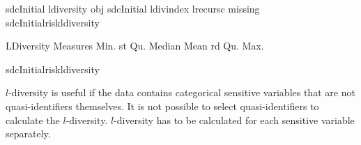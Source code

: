 \documentclass[letterpaper,10pt,english]{sphinxmanual}
\begin{document}
%
\begin{sphinxVerbatim}[commandchars=\\\{\}]

sdcInitial  ldiversity\PYGZbs{} obj  sdcInitial ldiv\PYGZus{}index   l\PYGZus{}recurs\PYGZus{}c   missing  
sdcInitialriskldiversity

LDiversity Measures
Min.  st Qu.  Median    Mean   rd Qu.    Max.
                            

sdcInitialriskldiversity\PYG{p}{[}\PYG{p}{]}

\PYG{p}{[}\PYG{p}{]}          
\end{sphinxVerbatim}

\(l\)-diversity is useful if the data contains categorical sensitive
variables that are not quasi-identifiers themselves. It is not possible
to select quasi-identifiers to calculate the \(l\)-diversity.
\(l\)-diversity has to be calculated for each sensitive variable
separately.
\end{document}
